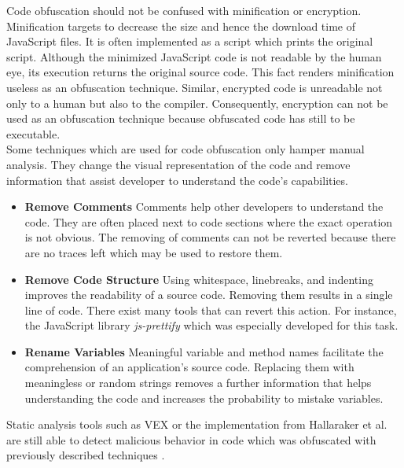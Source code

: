 			Code obfuscation should not be confused with minification or encryption. Minification targets to decrease the size and hence the download time of JavaScript files. It is often implemented as a script which prints the original script. Although the minimized JavaScript code is not readable by the human eye, its execution returns the original source code. This fact renders minification useless as an obfuscation technique. Similar, encrypted code is unreadable not only to a human but also to the compiler. Consequently, encryption can not be used as an obfuscation technique because obfuscated code has still to be executable. \\
		
			Some techniques which are used for code obfuscation only hamper manual analysis. They change the visual representation of the code and remove information that assist developer to understand the code's capabilities.
			
			\begin{itemize}
				\item \textbf{Remove Comments} Comments help other developers to understand the code. They are often placed next to code sections where the exact operation is not obvious. The removing of comments can not be reverted because there are no traces left which may be used to restore them.
				\item \textbf{Remove Code Structure} Using whitespace, linebreaks, and indenting improves the readability of a source code. Removing them results in a single line of code. There exist many tools that can revert this action. For instance, the JavaScript library \textit{js-prettify} which was especially developed for this task. %
				\item \textbf{Rename Variables} Meaningful variable and method names facilitate the comprehension of an application's source code. Replacing them with meaningless or random strings removes a further information that helps understanding the code and increases the probability to mistake variables.
			\end{itemize}
			
			Static analysis tools such as VEX or the implementation from Hallaraker et al. are still able to detect malicious behavior in code which was obfuscated with previously described techniques \cite{Bandhakavi:2011:VBE:1995376.1995398, Hallaraker:2005:DMJ:1078029.1078861}. 
			
